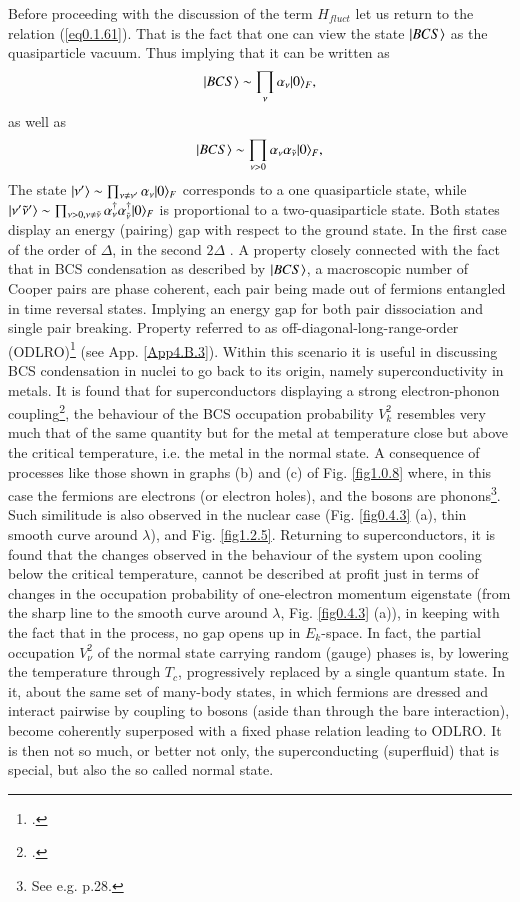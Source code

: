 Before proceeding with the discussion of the term $H_{fluct}$ let us return to the relation (\ref{eq0.1.61}). That is the fact that one can view the state $|{BCS} \rangle$ as the quasiparticle vacuum. Thus implying  that it can be written as
\begin{align}\label{eq1.4.57}
|{BCS} \rangle\sim\prod_{\nu}\alpha_\nu|{0} \rangle_F,
\end{align}
as well as
\begin{align}\label{eq1.4.58}
|{BCS} \rangle\sim\prod_{\nu>0}\alpha_\nu\alpha_{\tilde\nu}|{0} \rangle_F,
\end{align}
The state $|{\nu'} \rangle\sim\prod_{\nu\neq\nu'}\alpha_\nu|{0} \rangle_F$ corresponds to a one quasiparticle state, while $|{\nu'\tilde\nu'} \rangle\sim\prod_{\nu>0,\nu\neq\tilde\nu}\alpha_\nu^\dagger\alpha_{\tilde\nu}^\dagger|{0} \rangle_F$ is proportional to a two-quasiparticle state. Both states display an energy (pairing) gap with respect to the ground state. In the first case of the order of $\Delta$, in the second $2\Delta$ . A property closely connected with the fact that in BCS condensation as described by $|{BCS} \rangle$, a macroscopic number of Cooper pairs are phase coherent, each pair being made out of fermions entangled in time reversal states. Implying an energy gap for both pair dissociation and single pair breaking. Property referred to as off-diagonal-long-range-order (ODLRO)\footnote{\cite{Yang:62}.} (see App. \ref{App4.B.3}). Within this scenario it is useful in discussing BCS condensation in nuclei to go back to its origin, namely superconductivity in metals. It is found that for superconductors displaying a strong electron-phonon coupling\footnote{\cite{Bohr:58}.}, the behaviour of the BCS occupation probability $V^2_k$ resembles very much that of the same quantity but for the metal at temperature close but above the critical temperature, i.e. the metal in the normal state. A consequence of processes like those shown in graphs (b) and (c) of Fig. \ref{fig1.0.8} where, in this case the fermions are electrons (or electron holes), and the bosons are phonons\footnote{See e.g. \cite{Tinkham:96} p.28.}. Such similitude is also observed in the nuclear case (Fig. \ref{fig0.4.3} (a), thin smooth curve around $\lambda$), and Fig. \ref{fig1.2.5}. Returning to superconductors, it is found that the changes observed in the behaviour of the system upon cooling below the critical temperature, cannot be described at profit just in terms of changes in the occupation probability of one-electron momentum eigenstate (from the sharp line to the smooth curve around $\lambda$, Fig. \ref{fig0.4.3} (a)), in keeping with the fact that in the process, no gap opens up in $E_k$-space. In fact, the partial occupation $V^2_\nu$ of the normal state carrying random (gauge) phases is, by lowering the temperature through $T_c$, progressively replaced by a single quantum state. In it, about the same set of many-body states, in which fermions are dressed and interact pairwise by coupling to bosons (aside than through the bare interaction), become coherently superposed with a fixed phase relation leading to ODLRO. It is then not so much, or better not only, the superconducting (superfluid) that is special, but also the so called normal state.
 
